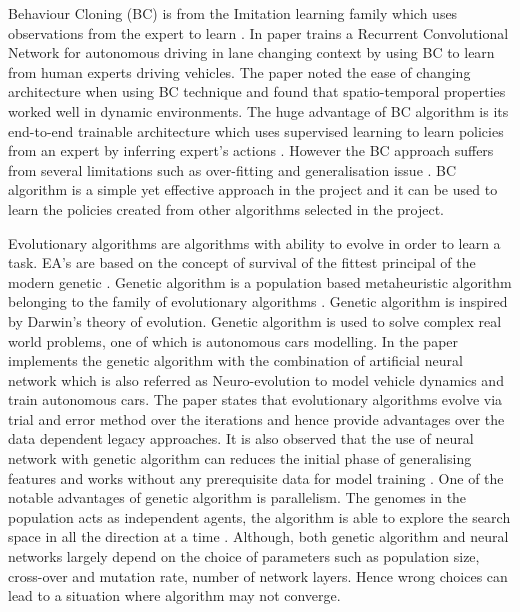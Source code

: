 \documentclass{svproc}
\begin{document}
Behaviour Cloning (BC) is from the Imitation learning family which uses observations from the expert to learn \cite{torabi2018behavioral}. In paper \cite{saksena2019towards} trains a Recurrent Convolutional Network for autonomous driving in lane changing context by using BC to learn from human experts driving vehicles. The paper noted the ease of changing architecture when using BC technique and found that spatio-temporal properties worked well in dynamic environments. The huge advantage of BC algorithm is its end-to-end trainable architecture which uses supervised learning to learn policies from an expert by inferring expert's actions \cite{codevilla2019exploring}\cite{farag2018behavior}\cite{ly2020learning}\cite{saksena2019towards}. However the BC approach suffers from several limitations such as over-fitting and generalisation issue \cite{codevilla2019exploring}. BC algorithm is a simple yet effective approach in the project and it can be used to learn the policies created from other algorithms selected in the project.

Evolutionary algorithms are algorithms with ability to evolve in order to learn a task. EA’s are based on the concept of survival of the fittest principal of the modern genetic \cite{yu2010introduction}.  Genetic algorithm is a population based metaheuristic algorithm belonging to the family of evolutionary algorithms \cite{yu2010introduction}. Genetic algorithm is inspired by Darwin’s theory of evolution. Genetic algorithm is used to solve complex real world problems, one of which is autonomous cars modelling. In the paper \cite{arulkumaran2017deep} implements the genetic algorithm with the combination of artificial neural network which is also referred as Neuro-evolution to model vehicle dynamics and train autonomous cars. The paper states that evolutionary algorithms evolve via trial and error method over the iterations and hence provide advantages over the data dependent legacy approaches. It is also observed that the use of neural network with genetic algorithm can reduces the initial phase of generalising features and works without any prerequisite data for model training \cite{arulkumaran2017deep}.  One of the notable advantages of genetic algorithm is parallelism. The genomes in the population acts as independent agents, the algorithm is able to explore the search space in all the direction at a time \cite{kiran2021deep}. Although, both genetic algorithm and neural networks largely depend on the choice of parameters such as population size, cross-over and mutation rate, number of network layers. Hence wrong choices can lead to a situation where algorithm may not converge. 
\end{document}
